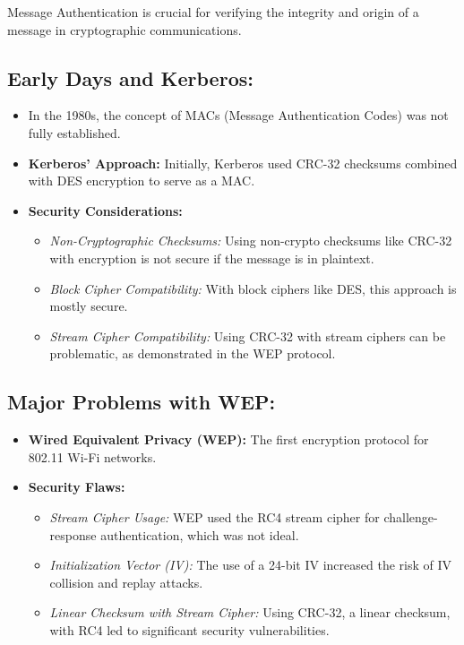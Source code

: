 \documentclass[12pt]{article}
\begin{document}
Message Authentication is crucial for verifying the integrity and origin of a message in cryptographic communications.

\subsection*{Early Days and Kerberos:}
\begin{itemize}
    \item In the 1980s, the concept of MACs (Message Authentication Codes) was not fully established.
    \item \textbf{Kerberos' Approach:} Initially, Kerberos used CRC-32 checksums combined with DES encryption to serve as a MAC.
    \item \textbf{Security Considerations:}
    \begin{itemize}
        \item \textit{Non-Cryptographic Checksums:} Using non-crypto checksums like CRC-32 with encryption is not secure if the message is in plaintext.
        \item \textit{Block Cipher Compatibility:} With block ciphers like DES, this approach is mostly secure.
        \item \textit{Stream Cipher Compatibility:} Using CRC-32 with stream ciphers can be problematic, as demonstrated in the WEP protocol.
    \end{itemize}
\end{itemize}

\subsection*{Major Problems with WEP:}
\begin{itemize}
    \item \textbf{Wired Equivalent Privacy (WEP):} The first encryption protocol for 802.11 Wi-Fi networks.
    \item \textbf{Security Flaws:}
    \begin{itemize}
        \item \textit{Stream Cipher Usage:} WEP used the RC4 stream cipher for challenge-response authentication, which was not ideal.
        \item \textit{Initialization Vector (IV):} The use of a 24-bit IV increased the risk of IV collision and replay attacks.
        \item \textit{Linear Checksum with Stream Cipher:} Using CRC-32, a linear checksum, with RC4 led to significant security vulnerabilities.
    \end{itemize}
\end{itemize}
\end{document}
